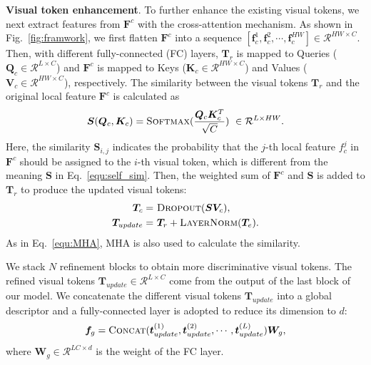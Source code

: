 \documentclass[letterpaper]{article} \usepackage{aaai22}  \usepackage{times}  \usepackage{helvet}  \usepackage{courier}  \usepackage[hyphens]{url}  \usepackage{graphicx} \urlstyle{rm} \def\UrlFont{\rm}  \usepackage{natbib}  \usepackage{caption} \DeclareCaptionStyle{ruled}{labelfont=normalfont,labelsep=colon,strut=off} \frenchspacing  \setlength{\pdfpagewidth}{8.5in}  \setlength{\pdfpageheight}{11in}  \usepackage{algorithm}
\newcommand{\Th}[1]{\textsc{#1}}
\begin{document}
\noindent\textbf{Visual token enhancement}. 
To further enhance the existing visual tokens, we next extract features from $\bm{F}^c$ with the cross-attention mechanism.
As shown in Fig.~\ref{fig:framwork}, we first flatten $\bm{F}^c$ into a sequence $\left[ \bm{f}_c^{1},\bm{f}_c^{2},\cdots,\bm{f}_c^{HW} \right] \in \mathcal{R}^{HW \times C}$.
Then, with different fully-connected (FC) layers, $\bm{T}_r$ is mapped to Queries ($\bm{Q}_{c} \in \mathcal{R}^{L \times C}$) and $\bm{F}^c$ is mapped to Keys ($\bm{K}_{c} \in \mathcal{R}^{HW \times C}$) and Values ($\bm{V}_{c} \in \mathcal{R}^{HW \times C}$), respectively.
The similarity between the visual tokens $\bm{T}_r$ and the original local feature $\bm{F}^c$ is calculated as
\begin{eqnarray}
	\label{equ:cross_sim}
	\bm{S}(\bm{Q}_{c},\bm{K}_{c})=\text{\Th{Softmax}}(\frac{\bm{Q}_{c} \bm{K}_{c}^{T}}{\sqrt{C}})\ \in \mathcal{R}^{L \times HW}.
\end{eqnarray}
Here, the similarity $\bm{S}_{i,j}$ indicates the probability that the $j$-th local feature $f_c^{j}$ in $\bm{F}^c$ should be assigned to the $i$-th visual token, which is different from the meaning $\bm{S}$ in Eq.~\eqref{equ:self_sim}.
Then, the weighted sum of $\bm{F}^c$ and $\bm{S}$ is added to $\bm{T}_r$ to produce the updated visual tokens:
\begin{eqnarray}
	\label{equ:cross_add}
	\begin{aligned}
		\bm{T}_{c} =& \ \text{\Th{Dropout}}(\bm{S}\bm{V}_{c}), \\
		\bm{T}_{update}=& \ \bm{T}_r+\text{\Th{LayerNorm}}(\bm{T}_{e}).
	\end{aligned}
\end{eqnarray}
As in Eq.~\eqref{equ:MHA}, MHA is also used to calculate the similarity.

We stack $N$ refinement blocks to obtain more discriminative visual tokens. 
The refined visual tokens $\bm{T}_{update}\in\mathcal{R}^{L \times C}$ come from the output of the last block of our model.
We concatenate the different visual tokens $\bm{T}_{update}$ into a global descriptor and 
a fully-connected layer is adopted to reduce its dimension to $d$:
\begin{eqnarray}\label{equ:dim_reduce}
	\bm{f}_{g}=\text{\Th{Concat}}(\bm{t}_{update}^{(1)},\bm{t}_{update}^{(2)},\cdots,\bm{t}_{update}^{(L)})\bm{W}_g,
\end{eqnarray}
where $\bm{W}_g \in \mathcal{R}^{LC \times d}$ is the weight of the FC layer.
\end{document}

